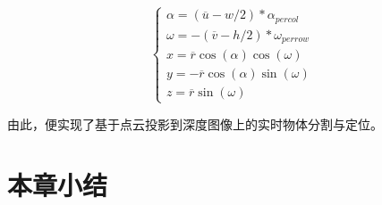 \begin{equation}
    \begin{cases}
        \alpha = (\overline{u} - w / 2) * \alpha_{percol} \\
        \omega = -(\overline{v} - h / 2) * \omega_{perrow} \\
        x = \overline{r}\cos(\alpha)\cos(\omega) \\
        y = -\overline{r}\cos(\alpha)\sin(\omega) \\
        z = \overline{r}\sin(\omega)
    \end{cases}
\end{equation}


由此，便实现了基于点云投影到深度图像上的实时物体分割与定位。

\section{本章小结}
